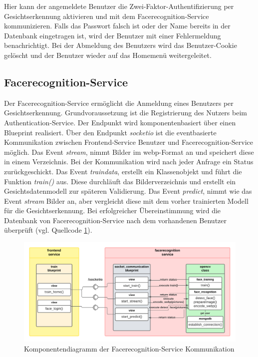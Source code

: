 Hier kann der angemeldete Benutzer die Zwei-Faktor-Authentifizierung per Gesichtserkennung aktivieren und mit dem Facerecognition-Service kommunizieren.
Falls das Passwort falsch ist oder der Name bereits in der Datenbank eingetragen ist, wird der Benutzer mit einer Fehlermeldung benachrichtigt.
Bei der Abmeldung des Benutzers wird das Benutzer-Cookie gelöscht und der Benutzer wieder auf das Homemenü weitergeleitet.

\subsection{Facerecognition-Service}
Der Facerecognition-Service ermöglicht die Anmeldung eines Benutzers per Gesichtserkennung.
Grundvoraussetzung ist die Registrierung des Nutzers beim Authentication-Service.
Der Endpunkt wird komponentenbasiert über einen Blueprint realisiert.
Über den Endpunkt \textit{socketio} ist die eventbasierte Kommunikation zwischen Frontend-Service Benutzer und Facerecognition-Service möglich.
Das Event \textit{stream}, nimmt Bilder im webp-Format an und speichert diese in einem Verzeichnis.
Bei der Kommunikation wird nach jeder Anfrage ein Status zurückgeschickt.
Das Event \textit{traindata}, erstellt ein Klassenobjekt und führt die Funktion \textit{train()} aus.
Diese durchläuft das Bilderverzeichnis und erstellt ein Gesichtsdatenmodell zur späteren Validierung.
Das Event \textit{predict}, nimmt wie das Event \textit{stream} Bilder an, aber vergleicht diese mit dem vorher trainierten Modell für die Gesichtserkennung.
Bei erfolgreicher Übereinstimmung wird die Datenbank von Facerecognition-Service nach dem vorhandenen Benutzer überprüft (vgl. Quellcode \ref{fig:facerecognitioncomponents}).

\begin{figure}[!htb]
  \centering
  \includegraphics[width=1.0\columnwidth]{images/FaceRecognitionDiagramm.png}
  \caption{Komponentendiagramm der Facerecognition-Service Kommunikation }
  \label{fig:facerecognitioncomponents}
\end{figure}

